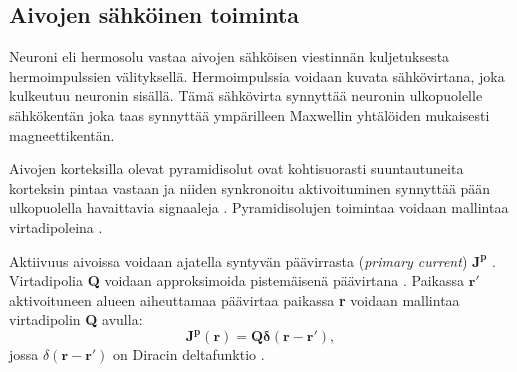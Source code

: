 \subsection{Aivojen sähköinen toiminta}
Neuroni eli hermosolu vastaa aivojen sähköisen viestinnän kuljetuksesta hermoimpulssien välityksellä. Hermoimpulssia voidaan kuvata sähkövirtana, joka kulkeutuu neuronin sisällä. Tämä sähkövirta synnyttää neuronin ulkopuolelle sähkökentän joka taas synnyttää ympärilleen Maxwellin yhtälöiden mukaisesti magneettikentän. 

Aivojen korteksilla olevat pyramidisolut ovat kohtisuorasti suuntautuneita korteksin pintaa vastaan ja niiden synkronoitu aktivoituminen synnyttää pään ulkopuolella havaittavia signaaleja \citep{He2018ElectrophysiologicalDynamics}. Pyramidisolujen toimintaa voidaan mallintaa virtadipoleina \citep[s. 10]{HariMEGprimer}. 

Aktiivuus aivoissa voidaan ajatella syntyvän päävirrasta (\textit{primary current}) $\mathbf{J^p}$ \citep{Baillet2001ElectromagneticMapping}. Virtadipolia \textbf{Q} voidaan approksimoida pistemäisenä päävirtana \citep{Hamalainen1993MagnetoencephalographytheoryBrain}. Paikassa $\mathbf{r'}$ aktivoituneen alueen aiheuttamaa päävirtaa paikassa \textbf{r} voidaan mallintaa virtadipolin \textbf{Q} avulla:
\begin{equation}
    \mathbf{J^p(r) = Q\delta (r-r')},
\end{equation}
jossa $\delta (\mathbf{r-r'})$ on Diracin deltafunktio \citep{Baillet2001ElectromagneticMapping}. 


